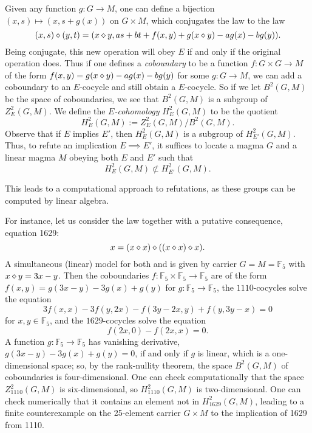 Given any function $g: G \to M$, one can define a bijection $(x,s) \mapsto (x,s+g(x))$ on $G \times M$, which conjugates the law  to the law
$$ (x,s) \diamond (y,t) = (x \diamond y, as + bt + f(x,y) + g(x \diamond y) - ag(x) - bg(y)).$$
Being conjugate, this new operation will obey $E$ if and only if the original operation does.
Thus if one defines a \emph{coboundary} to be a function $f: G \times G \to M$ of the form $f(x,y) =g(x \diamond y) - ag(x) - bg(y)$ for some $g: G \to M$, we can add a coboundary to an $E$-cocycle and still obtain a $E$-cocycle.  So if we let $B^2(G,M)$ be the space of coboundaries, we see that $B^2(G,M)$ is a subgroup of $Z^2_E(G,M)$.  We define the \emph{$E$-cohomology} $H^2_E(G,M)$ to be the quotient
$$ H^2_E(G,M) := Z^2_E(G,M) / B^2(G,M).$$
Observe that if $E$ implies $E'$, then $H^2_E(G,M)$ is a subgroup of $H^2_{E'}(G,M)$.  Thus, to refute an implication $E \implies E'$, it suffices to locate a magma $G$ and a linear magma $M$ obeying both $E$ and $E'$ such that
\begin{equation}\label{hgm}
  H^2_E(G,M) \not\subset H^2_{E'}(G,M).
\end{equation}

This leads to a computational approach to refutations, as these groups can be computed by linear algebra.

For instance, let us consider the law  together with a putative consequence, equation 1629:
\begin{equation}\label{1629}
  x = (x \diamond x) \diamond ((x \diamond x) \diamond x).
\end{equation}
A simultaneous (linear) model for both  and  is given by carrier $G=M={\mathbb F}_5$ with $x \diamond y = 3x-y$.  Then the coboundaries $f: {\mathbb F}_5 \times {\mathbb F}_5 \to {\mathbb F}_5$ are of the form $f(x,y) = g(3x-y) - 3g(x) + g(y)$ for $g: {\mathbb F}_5 \to {\mathbb F}_5$, the $1110$-cocycles solve the equation
$$3 f(x,x) - 3 f(y, 2x) - f(3y - 2x, y) + f( y, 3y - x) = 0$$
for $x,y \in {\mathbb F}_5$, and the $1629$-cocycles solve the equation
$$ f(2x,0) - f(2x,x) = 0.$$
A function $g:{\mathbb F}_5 \to {\mathbb F}_5$ has vanishing derivative, $g(3x-y) - 3g(x) + g(y) = 0$, if and only if $g$ is linear, which is a one-dimensional space; so, by the rank-nullity theorem, the space $B^2(G,M)$ of coboundaries is four-dimensional.  One can check computationally that the space $Z^2_{1110}(G,M)$ is six-dimensional, so $H^2_{1110}(G,M)$ is two-dimensional.  One can check numerically that it contains an element not in $H^2_{1629}(G,M)$, leading to a finite counterexample on the 25-element carrier $G \times M$ to the implication of 1629 from 1110.

